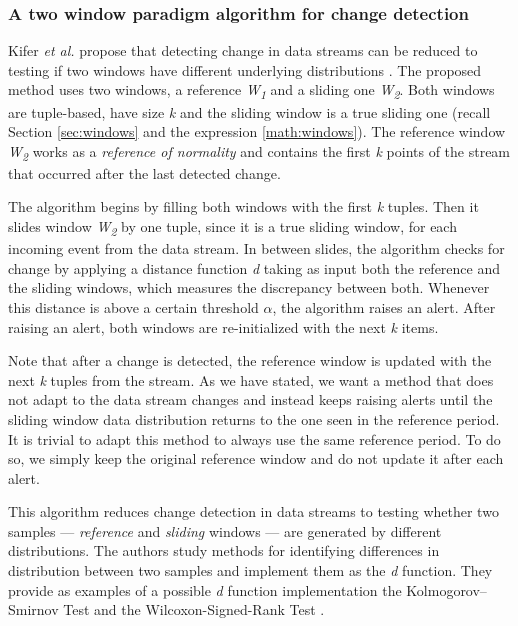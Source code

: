 \subsubsection{A two window paradigm algorithm for change detection} \label{kifer}
Kifer \emph{et al.} propose that detecting change in data streams can be reduced to testing if two windows have different underlying distributions \cite{Kifer-Detecting-Change}. The proposed method uses two windows, a reference \textit{W\textsubscript{1}} and a sliding one \textit{W\textsubscript{2}}. Both windows are tuple-based, have size \textit{k} and the sliding window is a true sliding one (recall Section \ref{sec:windows} and the expression \ref{math:windows}). The reference window \textit{W\textsubscript{2}} works as a \textit{reference of normality} and contains the first \textit{k} points of the stream that occurred after the last detected change.

The algorithm begins by filling both windows with the first \textit{k} tuples. Then it slides window \textit{W\textsubscript{2}} by one tuple, since it is a true sliding window, for each incoming event from the data stream. In between slides, the algorithm checks for change by applying a distance function \textit{d} taking as input both the reference and the sliding windows, which measures the discrepancy between both. Whenever this distance is above a certain threshold $\alpha$, the algorithm raises an alert. After raising an alert, both windows are re-initialized with the next \textit{k} items.

Note that after a change is detected, the reference window is updated with the next \textit{k} tuples from the stream. As we have stated, we want a method that does not adapt to the data stream changes and instead keeps raising alerts until the sliding window data distribution returns to the one seen in the reference period. It is trivial to adapt this method to always use the same reference period. To do so, we simply keep the original reference window and do not update it after each alert.

This algorithm reduces change detection in data streams to testing whether two samples --- \textit{reference} and \textit{sliding} windows --- are generated by different distributions. The authors study methods for identifying differences in distribution between two samples and implement them as the \textit{d} function. They provide as examples of a possible \textit{d} function implementation the  Kolmogorov–Smirnov Test \cite{Kolmogorov-Smirnov} and the Wilcoxon-Signed-Rank Test \cite{Wilcoxon}.

